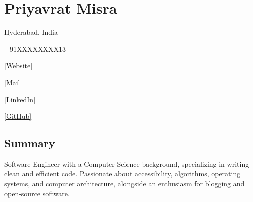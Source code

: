 \documentclass[letterpaper,10pt]{article}
\begin{document}
    \section{\huge{Priyavrat Misra}}
    \begin{enumerate*}[label={}, itemjoin={\quad}]
        \item{Hyderabad, India}
        \item{+91XXXXXXXX13}
        \item{\href{https://priyavr.at}{[Website]}}
        \item{\href{mailto:priyavratmisra123@gmail.com}{[Mail]}}
        \item{\href{https://linkedin.com/in/priyavrat-misra}{[LinkedIn]}}
        \item{\href{https://github.com/priyavrat-misra}{[GitHub]}}
    \end{enumerate*}
    \subsection{Summary}
        Software Engineer with a Computer Science background, specializing in writing clean and efficient code. Passionate about accessibility, algorithms, operating systems, and computer architecture, alongside an enthusiasm for blogging and open-source software.
\end{document}
